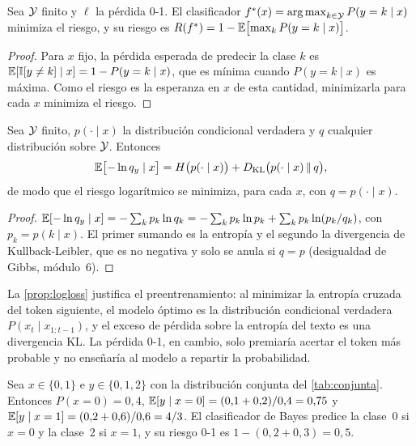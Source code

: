 \begin{proposicion}\label{prop:bayes}
Sea $\mathcal{Y}$ finito y $\ell$ la pérdida 0-1. El clasificador $f^{*}(x)=\operatorname*{arg\,max}_{k\in\mathcal{Y}}P(y=k\mid x)$ minimiza el riesgo, y su riesgo es $R(f^{*})=1-\mathbb{E}\bigl[\max_k P(y=k\mid x)\bigr]$.
\end{proposicion}

\begin{proof}
Para $x$ fijo, la pérdida esperada de predecir la clase $k$ es $\mathbb{E}[\mathbb{I}[y\ne k]\mid x]=1-P(y=k\mid x)$, que es mínima cuando $P(y=k\mid x)$ es máxima. Como el riesgo es la esperanza en $x$ de esta cantidad, minimizarla para cada $x$ minimiza el riesgo.
\end{proof}

\begin{proposicion}\label{prop:logloss}
Sea $\mathcal{Y}$ finito, $p(\cdot\mid x)$ la distribución condicional verdadera y $q$ cualquier distribución sobre $\mathcal{Y}$. Entonces
\[
\mathbb{E}\bigl[-\ln q_y\mid x\bigr]=H\bigl(p(\cdot\mid x)\bigr)+D_{\mathrm{KL}}\bigl(p(\cdot\mid x)\,\Vert\,q\bigr),
\]
de modo que el riesgo logarítmico se minimiza, para cada $x$, con $q=p(\cdot\mid x)$.
\end{proposicion}

\begin{proof}
$\mathbb{E}[-\ln q_y\mid x]=-\sum_k p_k\ln q_k=-\sum_k p_k\ln p_k+\sum_k p_k\ln(p_k/q_k)$, con $p_k=p(k\mid x)$. El primer sumando es la entropía y el segundo la divergencia de Kullback-Leibler, que es no negativa y solo se anula si $q=p$ (desigualdad de Gibbs, módulo~6).
\end{proof}

\begin{observacion}
La \cref{prop:logloss} justifica el preentrenamiento: al minimizar la entropía cruzada del token siguiente, el modelo óptimo es la distribución condicional verdadera $P(x_t\mid x_{1:t-1})$, y el exceso de pérdida sobre la entropía del texto es una divergencia KL. La pérdida 0-1, en cambio, solo premiaría acertar el token más probable y no enseñaría al modelo a repartir la probabilidad.
\end{observacion}

\begin{ejemplo}\label{ej:bayes}
Sea $x\in\{0,1\}$ e $y\in\{0,1,2\}$ con la distribución conjunta del \cref{tab:conjunta}. Entonces $P(x=0)=0{,}4$, $\mathbb{E}[y\mid x=0]=(0{,}1+0{,}2)/0{,}4=0{,}75$ y $\mathbb{E}[y\mid x=1]=(0{,}2+0{,}6)/0{,}6=4/3$. El clasificador de Bayes predice la clase~0 si $x=0$ y la clase~2 si $x=1$, y su riesgo 0-1 es $1-(0{,}2+0{,}3)=0{,}5$.
\end{ejemplo}

